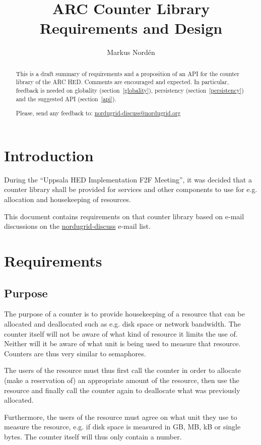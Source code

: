 \documentclass[a4paper,11pt]{article}
\title{ARC Counter Library\\
Requirements and Design}
\author{Markus Nord\'en}
\begin{document}
\maketitle


\begin{abstract}
  This is a draft summary of requirements and a proposition of an API
  for the counter library of the ARC HED. Comments are encouraged and
  expected. In particular, feedback is needed on globality
  (section~\ref{globality}), persistency (section~\ref{persistency})
  and the suggested API (section~\ref{api}).

  Please, send any feedback to: \url{nordugrid-discuss@nordugrid.org}
\end{abstract}


\section{Introduction}

During the ``Uppsala HED Implementation F2F Meeting'', it was decided
that a counter library shall be provided for services and other
components to use for e.g. allocation and housekeeping of resources.

This document contains requirements on that counter library based on
e-mail discussions on the \url{nordugrid-discuss} e-mail list.


\section{Requirements}

\subsection{Purpose}

The purpose of a counter is to provide housekeeping of a resource that
can be allocated and deallocated such as e.g. disk space or network
bandwidth. The counter itself will not be aware of what kind of
resource it limits the use of. Neither will it be aware of what unit
is being used to measure that resource. Counters are thus very similar
to semaphores.

The users of the resource must thus first call the counter in order to
allocate (make a reservation of) an appropriate amount of the
resource, then use the resource and finally call the counter again to
deallocate what was previously allocated.

Furthermore, the users of the resource must agree on what unit they
use to measure the resource, e.g. if disk space is measured in GB, MB,
kB or single bytes. The counter itself will thus only contain a number.
\end{document}
